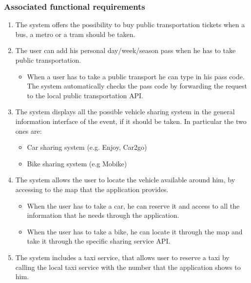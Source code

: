 \subsubsection{Associated functional requirements}
\begin{enumerate}
\item The system offers the possibility to buy public transportation tickets when a bus, a metro or a tram should be taken.
\item The user can add his personal day/week/season pass when he has to take public transportation.
\begin{itemize}
\item When a user has to take a public transport he can type in his pass code. The system automatically checks the pass code by forwarding the request to the local public transportation API.
\end{itemize}
\item The system displays all the possible vehicle sharing system in the general information interface of the event, if it should be taken. In particular the two ones are:
		\begin{itemize}
        \item Car sharing system (e.g. Enjoy, Car2go)
        \item Bike sharing system (e.g Mobike)
		\end{itemize}
\item The system allows the user to locate the vehicle available around him, by accessing to the map that the application provides.
\begin{itemize}
\item When the user has to take a car, he can reserve it and access to all the information that he needs through the application.
\item When the user has to take a bike, he can locate it through the map and take it through the specific sharing service API.
\end{itemize}
\item The system includes a taxi service, that allows user to reserve a taxi by calling the local taxi service with the number that the application shows to him.
\end{enumerate}

